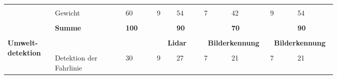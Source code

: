 \documentclass[main.tex]{subfiles} %
\begin{document}
\begin{landscape}
\begin{table}[ht]
\begin{tabular}{|p{0.11\linewidth}|p{0.18\linewidth}|p{0.085\linewidth}|p{0.057\linewidth}|p{0.07\linewidth}|p{0.057\linewidth}|p{0.07\linewidth}|p{0.057\linewidth}|p{0.07\linewidth}|}
            \cline{2-9}
                                                           &                                     &                                            &                                             &                                             &   &               &   &             \\[-9pt]
                                                           & Gewicht                             & 60                                         & 9                                           & 54                                          & 7 & 42            & 9 & 54          \\[1pt]
            \cline{2-9}
                                                           &                                     &                                            &                                             &                                             &   &               &   &             \\[-9pt]
                                                           & \textbf{Summe}                      & \textbf{100}                               &                                             & \textbf{90}                                 &   & \textbf{70}   &   & \textbf{90} \\[1pt]
            \hline
            \hline
                                                           & \multicolumn{2}{c|}{}               & \multicolumn{2}{c|}{}                      & \multicolumn{2}{c|}{}                       & \multicolumn{2}{c|}{}                                                             \\[-9pt]
            \multirow{6}{4em}{\textbf{Umwelt-detektion}}   & \multicolumn{2}{c|}{}               & \multicolumn{2}{c|}{\textbf{Lidar}}        & \multicolumn{2}{c|}{\textbf{Bilderkennung}} & \multicolumn{2}{c|}{\textbf{Bilderkennung}}                                       \\[1pt]
            \cline{2-9}
                                                           &                                     &                                            &                                             &                                             &   &               &   &             \\[-9pt]
                                                           & Detektion der Fahrlinie             & 30                                         & 9                                           & 27                                          & 7 & 21            & 7 & 21          \\[1pt]

\end{tabular}
\end{table}
\end{landscape}
\end{document}
